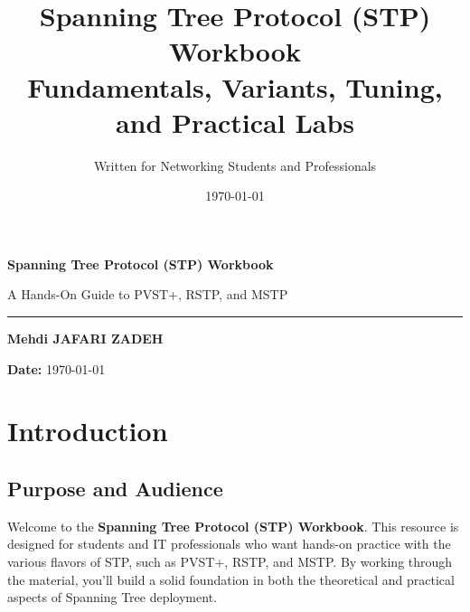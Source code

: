 \documentclass[a4paper]{report}
\title{\Huge \textbf{Spanning Tree Protocol (STP) Workbook}\\
       \Large Fundamentals, Variants, Tuning, and Practical Labs}
\author{\Large Written for Networking Students and Professionals}
\date{\today}
\begin{document}
\begin{titlepage}
    \centering

    \vspace*{4cm}
    {\Huge \textbf{Spanning Tree Protocol (STP) Workbook}\par}
    \vspace{0.8cm}
    {\Large A Hands-On Guide to PVST+, RSTP, and MSTP\par}
    \vspace{0.3cm}
    \rule{0.9\textwidth}{1pt}
    
    \vspace{0.6cm}
    {\large \textbf{Mehdi JAFARI ZADEH}}\par
    \vspace{0.3cm}

    
    \vfill
    \textbf{Date:} \today
    \vspace{2cm}
\end{titlepage}

\tableofcontents
\newpage

\chapter{Introduction}

\section{Purpose and Audience}
Welcome to the \textbf{Spanning Tree Protocol (STP) Workbook}. This resource is designed for students and IT professionals who want hands-on practice with the various flavors of STP, such as PVST+, RSTP, and MSTP. By working through the material, you’ll build a solid foundation in both the theoretical and practical aspects of Spanning Tree deployment.
\end{document}
